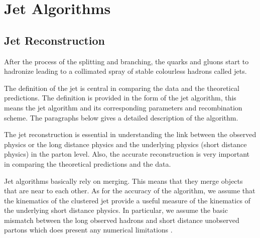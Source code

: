 \chapter{Jet Algorithms}

\section{Jet Reconstruction}
After the process of the splitting and branching, the quarks and gluons start to hadronize leading to a collimated spray of stable colourless hadrons called jets. 

The definition of the jet is central in comparing the data and the theoretical predictions. The definition is provided in the form of the jet algorithm, this means the jet algorithm and its corresponding parameters and recombination scheme. The paragraphs below gives a detailed description of the algorithm. 


The jet reconstruction is essential in understanding the link between the observed physics or the long distance physics and the underlying physics (short distance physics) in the parton level. Also, the accurate reconstruction is very important in comparing the theoretical predictions and the data. 


Jet algorithms basically rely on merging. This means that they merge objects that are near to each other.  As for the accuracy of the algorithm, we assume that the kinematics of the clustered jet provide a useful measure of the kinematics of the underlying short distance physics. In particular, we assume the basic mismatch between the long observed hadrons and short distance unobserved partons which does present any numerical limitations \citep{Ellis:2007ib}. 

    

